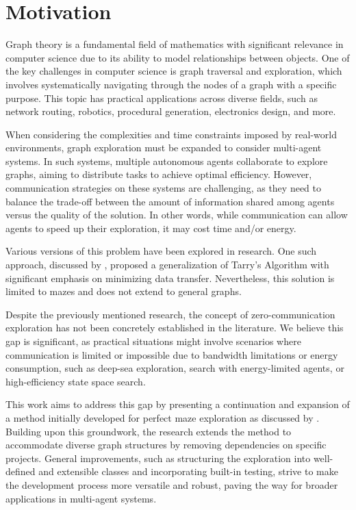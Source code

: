 \section{Motivation}
\label{section_intro_motivation}

Graph theory is a fundamental field of mathematics with significant relevance in
computer science due to its ability to model relationships between objects.
One of the key challenges in computer science is graph traversal and exploration, which involves systematically navigating through the nodes of a graph
with a specific purpose. This topic has practical applications across diverse fields, such as network routing, robotics, procedural generation, electronics design, and more.

When considering the complexities and time constraints imposed by real-world environments,
graph exploration must be expanded to consider multi-agent systems. In such systems, multiple
autonomous agents collaborate to explore graphs, aiming to distribute tasks to achieve optimal efficiency. However, communication strategies
on these systems are challenging, as they need to balance the trade-off between the amount of information shared among agents
versus the quality of the solution. In other words, while communication can allow
agents to speed up their exploration, it may cost time and/or energy.

Various versions of this problem have been explored in research. 
One such approach, discussed by , proposed a generalization of Tarry's Algorithm with significant emphasis on minimizing data transfer.
Nevertheless, this solution is limited to mazes and does not extend to general graphs.

Despite the previously mentioned research, the concept of zero-communication exploration has not been
concretely established in the literature. We believe this gap is significant, as practical situations might involve
scenarios where communication is limited or impossible due to bandwidth limitations or energy consumption, such as deep-sea exploration,
search with energy-limited agents, or high-efficiency state space search. 

This work aims to address this gap by presenting a continuation
and expansion of a method initially developed for perfect maze exploration \cite{Naeem2021} as discussed by .
Building upon this groundwork, the research extends the method to accommodate diverse graph structures by removing dependencies on specific projects. 
General improvements, such as structuring the exploration into well-defined and extensible classes
and incorporating built-in testing, strive to make the development process more versatile and robust, paving the way for broader applications in multi-agent systems.


